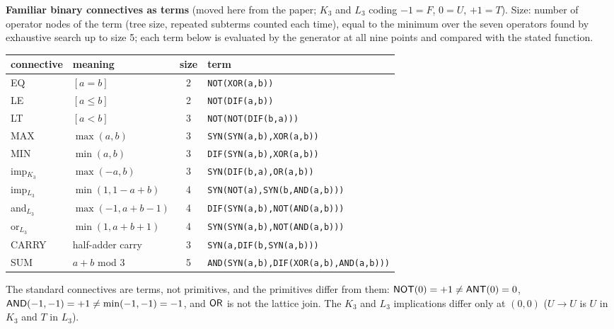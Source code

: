 \documentclass[10pt,a4paper]{article}
\begin{document}
\textbf{Familiar binary connectives as terms} (moved here from the paper; $K_3$ and $L_3$ coding $-1=F$, $0=U$, $+1=T$). Size: number of operator nodes of the term (tree size, repeated subterms counted each time), equal to the minimum over the seven operators found by exhaustive search up to size 5; each term below is evaluated by the generator at all nine points and compared with the stated function.
\begin{center}\small\begin{longtable}{llcp{8.2cm}}\toprule connective&meaning&size&term\\\midrule\endhead
\textsf{EQ}&$[a=b]$&2&\texttt{NOT(\allowbreak XOR(\allowbreak a,\allowbreak b))}\\
\textsf{LE}&$[a\le b]$&2&\texttt{NOT(\allowbreak DIF(\allowbreak a,\allowbreak b))}\\
\textsf{LT}&$[a<b]$&3&\texttt{NOT(\allowbreak NOT(\allowbreak DIF(\allowbreak b,\allowbreak a)))}\\
\textsf{MAX}&$\max(a,b)$&3&\texttt{SYN(\allowbreak SYN(\allowbreak a,\allowbreak b),\allowbreak XOR(\allowbreak a,\allowbreak b))}\\
\textsf{MIN}&$\min(a,b)$&3&\texttt{DIF(\allowbreak SYN(\allowbreak a,\allowbreak b),\allowbreak XOR(\allowbreak a,\allowbreak b))}\\
imp$_{K_3}$&$\max(-a,b)$&3&\texttt{SYN(\allowbreak DIF(\allowbreak b,\allowbreak a),\allowbreak OR(\allowbreak a,\allowbreak b))}\\
imp$_{L_3}$&$\min(1,1-a+b)$&4&\texttt{SYN(\allowbreak NOT(\allowbreak a),\allowbreak SYN(\allowbreak b,\allowbreak AND(\allowbreak a,\allowbreak b)))}\\
and$_{L_3}$&$\max(-1,a+b-1)$&4&\texttt{DIF(\allowbreak SYN(\allowbreak a,\allowbreak b),\allowbreak NOT(\allowbreak AND(\allowbreak a,\allowbreak b)))}\\
or$_{L_3}$&$\min(1,a+b+1)$&4&\texttt{SYN(\allowbreak SYN(\allowbreak a,\allowbreak b),\allowbreak NOT(\allowbreak AND(\allowbreak a,\allowbreak b)))}\\
\textsf{CARRY}&half-adder carry&3&\texttt{SYN(\allowbreak a,\allowbreak DIF(\allowbreak b,\allowbreak SYN(\allowbreak a,\allowbreak b)))}\\
\textsf{SUM}&$a+b$ mod 3&5&\texttt{AND(\allowbreak SYN(\allowbreak a,\allowbreak b),\allowbreak DIF(\allowbreak XOR(\allowbreak a,\allowbreak b),\allowbreak AND(\allowbreak a,\allowbreak b)))}\\
\bottomrule\end{longtable}\end{center}
The standard connectives are terms, not primitives, and the primitives differ from them: $\mathsf{NOT}(0)=+1\neq\mathsf{ANT}(0)=0$, $\mathsf{AND}(-1,-1)=+1\neq\min(-1,-1)=-1$, and $\mathsf{OR}$ is not the lattice join. The $K_3$ and $L_3$ implications differ only at $(0,0)$ ($U\to U$ is $U$ in $K_3$ and $T$ in $L_3$).
\end{document}
